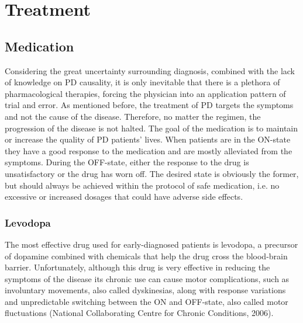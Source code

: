 \chapter{Treatment}
\label{app:appTreatment}
\pagestyle{fancy}
\fancyhf{}
\fancyhead[OC]{\leftmark}
\fancyhead[EC]{\rightmark}
\cfoot{\thepage}


\section{Medication}
\label{sec:medication}
Considering the great uncertainty surrounding diagnosis, combined with the lack of knowledge on PD causality, it is only inevitable that there is a plethora of pharmacological therapies, forcing the physician into an application pattern of trial and error. As mentioned before, the treatment of PD targets the symptoms and not the cause of the disease. Therefore, no matter the regimen, the progression of the disease is not halted. The goal of the medication is to maintain or increase the quality of PD patients' lives. When patients are in the ON-state they have a good response to the medication and are mostly alleviated from the symptoms. During the OFF-state, either the response to the drug is unsatisfactory or the drug has worn off. The desired state is obviously the former, but should always be achieved within the protocol of safe medication, i.e. no excessive or increased dosages that could have adverse side effects. 


\subsection{Levodopa}
\label{subsec:levodopa}
The most effective drug used for early-diagnosed patients is levodopa, a precursor of dopamine combined with chemicals that help the drug cross the blood-brain barrier. Unfortunately, although this drug is very effective in reducing the symptoms of the disease its chronic use can cause motor complications, such as involuntary movements, also called dyskinesias, along with response variations and unpredictable switching between the ON and OFF-state, also called motor fluctuations (National Collaborating Centre for Chronic Conditions, 2006). 


